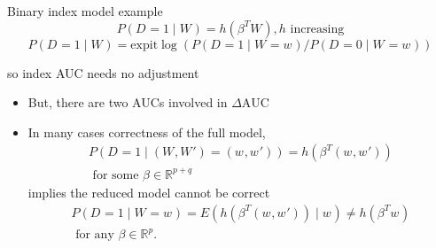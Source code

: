 \documentclass{beamer}
\newcommand{\E}{E}
\renewcommand{\P}{P}
\newcommand{\W}[1][]{W_{#1}}
\newcommand{\w}[1][]{w_{#1}}
\newcommand{\D}[1][]{D_{#1}}
\renewcommand{\t}[1]{{#1}^T}
\newcommand{\aucdiff}{\Delta\text{AUC}}
\begin{document}






\begin{frame}
Binary index model example 
$$ P(\D=1\mid \W) = h(\t\beta \W), \text{$h$ increasing} $$
$$ P(\D=1\mid \W) = \text{expit}\log(P(\D=1\mid \W=\w)/P(\D=0\mid \W=\w)) $$

 so index AUC needs no adjustment
\end{frame}

\begin{frame}
  \begin{itemize}
\item But, there are two AUCs involved in $\aucdiff$%

\item In many cases correctness of the full
model,
\begin{align}
    \P(\D=1\mid(\W,\W')=(\w,\w')) = h(\t\beta (\w,\w'))\\ \text{ for some }\beta\in\mathbb{R}^{p+q}
\end{align}
implies the reduced model cannot be correct
\begin{align}
  \P(\D=1\mid \W=\w)=\E(h(\t\beta (\w,\w'))\mid \w)\neq h(\t\beta \w)\\ \text{ for any }\beta\in\mathbb{R}^p.
\end{align}
\end{itemize}
\end{frame}
\end{document}
